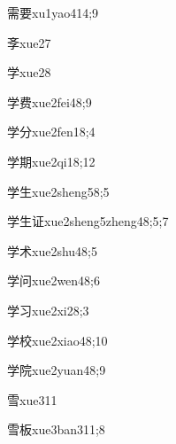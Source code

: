 \begin{verbete}{需要}{xu1yao4}{14;9}
\end{verbete}
\begin{verbete}{斈}{xue2}{7}
\end{verbete}
\begin{verbete}{学}{xue2}{8}
\end{verbete}
\begin{verbete}{学费}{xue2fei4}{8;9}
\end{verbete}
\begin{verbete}{学分}{xue2fen1}{8;4}
\end{verbete}
\begin{verbete}{学期}{xue2qi1}{8;12}
\end{verbete}
\begin{verbete}{学生}{xue2sheng5}{8;5}
\end{verbete}
\begin{verbete}{学生证}{xue2sheng5zheng4}{8;5;7}
\end{verbete}
\begin{verbete}{学术}{xue2shu4}{8;5}
\end{verbete}
\begin{verbete}{学问}{xue2wen4}{8;6}
\end{verbete}
\begin{verbete}{学习}{xue2xi2}{8;3}
\end{verbete}
\begin{verbete}{学校}{xue2xiao4}{8;10}
\end{verbete}
\begin{verbete}{学院}{xue2yuan4}{8;9}
\end{verbete}
\begin{verbete}{雪}{xue3}{11}
\end{verbete}
\begin{verbete}{雪板}{xue3ban3}{11;8}
\end{verbete}
